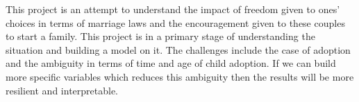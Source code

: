 \documentclass[11pt, a4paper, leqno]{article}
\begin{document}
This project is an attempt to understand the impact of freedom given to ones' choices in terms of marriage laws and the encouragement given to 
these couples to start a family. This project is in a primary stage of understanding the situation and building a model on it. The challenges 
include the case of adoption and the ambiguity in terms of time and age of child adoption. If we can build more specific variables which reduces 
this ambiguity then the results will be more resilient and interpretable.




\printbibliography
{}



\end{document}
